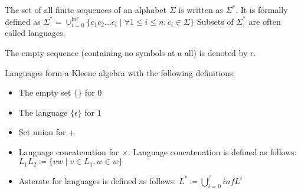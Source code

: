 \begin{definition}
    The set of all finite sequences of an alphabet $\Sigma$ is written as $\Sigma^\ast$.
    It is formally defined as
    $\Sigma^\ast = \cup_{i=0}^{\inf} \{c_1 c_2 \ldots c_i \mid \forall 1 \le i \le n: c_i \in \Sigma \} $
    Subsets of $\Sigma^\ast$ are often called languages.
\end{definition}

The empty sequence (containing no symbols at a all) is denoted by $\epsilon$.

\begin{theorem}
    Languages form a Kleene algebra with the following definitions:
    \begin{itemize}
        \item The empty set $\{\}$ for $0$
        \item The language $\{ \epsilon \}$ for $1$
        \item Set union for $+$
        \item Language concatenation for $\times$.
        Language concatenation is defined as follows:
        $L_1 L_2 \coloneqq \{ v w \mid v \in L_1, w \in w \} $
        \item Asterate for languages is defined as follows:
        $L^\ast \coloneqq \bigcup\limits_{i = 0}^/inf L^i$
    \end{itemize}
\end{theorem}
